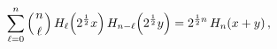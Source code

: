 \[\sum_{\ell=0}^{n}{\left({{n}\atop{\ell}}\right)}\mathop{H_{\ell}\/}\nolimits\!%
\left(2^{\frac{1}{2}}x\right)\mathop{H_{n-\ell}\/}\nolimits\!\left(2^{\frac{1}%
{2}}y\right)=2^{\frac{1}{2}n}\mathop{H_{n}\/}\nolimits\!\left(x+y\right),\]